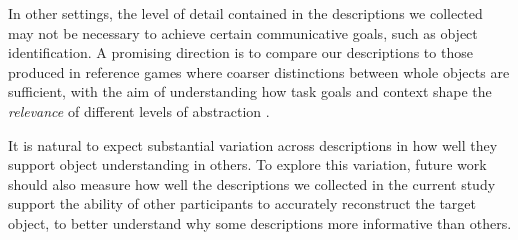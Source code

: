 \documentclass[10pt,letterpaper]{article}
\begin{document}
In other settings, the level of detail contained in the descriptions we collected may not be necessary to achieve certain communicative goals, such as object identification. 
A promising direction is to compare our descriptions to those produced in reference games where coarser distinctions between whole objects are sufficient, with the aim of understanding how task goals and context shape the \emph{relevance} of different levels of abstraction . 

It is natural to expect substantial variation across descriptions in how well they support object understanding in others.
To explore this variation, future work should also measure how well the descriptions we collected in the current study support the ability of other participants to accurately reconstruct the target object, to better understand why some descriptions more informative than others.


\end{document}
